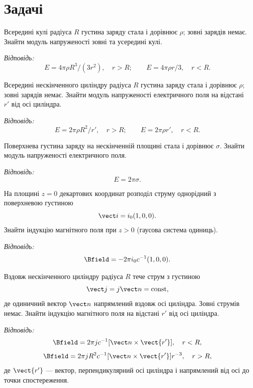 \section*{Задачі}

\begin{problem}
Всередині кулі радіуса \(R\) густина заряду стала і дорівнює \(\rho\); зовні зарядів немає. Знайти модуль напруженості зовні та усередині кулі.

\textit{Відповідь:}
\[
	E = 4\pi\rho R^3/(3r^2), \quad r > R; \qquad
	E = 4\pi\rho r/3, \quad r < R.
\]
\end{problem}

\begin{problem}
Всередині нескінченного циліндру радіуса \(R\) густина заряду стала і дорівнює \(\rho\); зовні зарядів немає. Знайти модуль напруженості електричного поля на відстані \(r'\) від осі циліндра.

\textit{Відповідь:}
\[
	E = 2\pi\rho R^2/r', \quad r > R; \qquad
	E = 2\pi\rho r', \quad r < R.
\]
\end{problem}

\begin{problem}
Поверхнева густина заряду на нескінченній площині стала і дорівнює \(\sigma\). Знайти модуль напруженості електричного поля.

\textit{Відповідь:}
\[
	E = 2\pi\sigma.
\]
\end{problem}

\begin{problem}
На площині \(z=0\) декартових координат розподіл струму однорідний з поверхневою густиною
\[
	\vect i = i_0(1,0,0).
\]
Знайти індукцію магнітного поля при \(z>0\) (гаусова система одиниць).

\textit{Відповідь:}
\[
	\Bfield = -2\pi i_0 c^{-1}(1,0,0).
\]
\end{problem}

\begin{problem}
Вздовж нескінченного циліндру радіуса \(R\) тече струм з густиною
\[
	\vect j = j \vect n = \text{const},
\]
де одиничний вектор \(\vect n\) напрямлений вздовж осі циліндра. Зовні струмів немає. Знайти індукцію магнітного поля на відстані \(r'\) від осі циліндра.

\textit{Відповідь:}
\[
	\Bfield = 2\pi j c^{-1} [\vect n \times \vect{r'}], \quad r < R,
\]
\[
	\Bfield = 2\pi j R^2 c^{-1} [\vect n \times \vect{r'}] r^{-3}, \quad r > R,
\]
де \(\vect{r'}\) --- вектор, перпендикулярний осі циліндра і напрямлений від осі до точки спостереження.
\end{problem}


